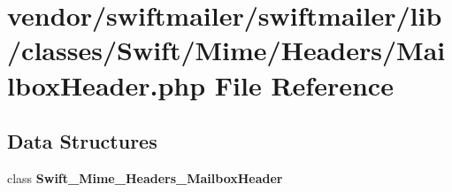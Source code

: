 \section{vendor/swiftmailer/swiftmailer/lib/classes/\+Swift/\+Mime/\+Headers/\+Mailbox\+Header.php File Reference}
\label{_mailbox_header_8php}
\subsection*{Data Structures}
\begin{DoxyCompactItemize}
\item 
class {\bf Swift\+\_\+\+Mime\+\_\+\+Headers\+\_\+\+Mailbox\+Header}
\end{DoxyCompactItemize}
